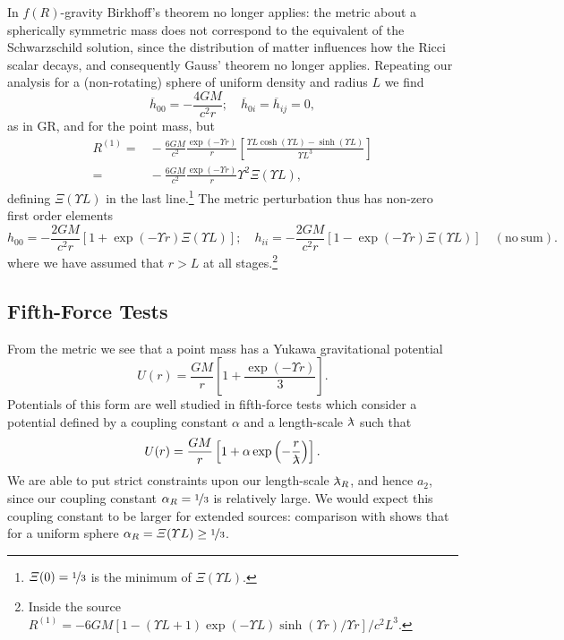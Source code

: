 In $f(R)$-gravity Birkhoff's theorem no longer applies: the metric about a spherically symmetric mass does not correspond to the equivalent of the Schwarzschild solution, since the distribution of matter influences how the Ricci scalar decays, and consequently Gauss' theorem no longer applies. Repeating our analysis for a (non-rotating) sphere of uniform density and radius $L$ we find
\begin{equation}
\overline{h}_{00} = -\frac{4GM}{c^2r}; \quad \overline{h}_{0i} = \overline{h}_{ij} = 0,
\end{equation}
as in GR, and for the point mass, but
\begin{align}
R^{(1)} = & {} -\frac{6 G M}{c^2}\frac{\exp(- \Upsilon r)}{r}\left[\frac{\Upsilon L\cosh(\Upsilon L) - \sinh(\Upsilon L)}{\Upsilon L^3}\right] \\
 = & {} -\frac{6 G M}{c^2}\frac{\exp(- \Upsilon r)}{r}\Upsilon^2\Xi(\Upsilon L),
\end{align}
defining $\Xi(\Upsilon L)$ in the last line.\footnote{$\Xi(0) = \nicefrac{1}{3}$ is the minimum of $\Xi(\Upsilon L)$.} The metric perturbation thus has non-zero first order elements\cite{Stelle1978, Capozziello2009b}
\begin{equation}
h_{00} = -\frac{2GM}{c^2r}\left[1 + \exp(- \Upsilon r)\Xi(\Upsilon L)\right]; \quad h_{ii} = -\frac{2GM}{c^2r}\left[1 - \exp(- \Upsilon r)\Xi(\Upsilon L)\right] \quad \mathrm{(no\: sum)}.
\label{eq:Uniform}
\end{equation}
where we have assumed that $r > L$ at all stages.\footnote{Inside the source $R^{(1)} = -{6 G M}\left[1 - (\Upsilon L + 1)\exp(-\Upsilon L)\sinh(\Upsilon r)/\Upsilon r\right]/{c^2L^3}$.}

\subsection{Fifth-Force Tests}\label{sec:Fifth}

From the metric  we see that a point mass has a Yukawa gravitational potential\cite{Stelle1978, Capozziello2009a}
\begin{equation}
U(r) = \frac{GM}{r}\left[1 + \frac{\exp(- \Upsilon r)}{3}\right].
\end{equation}
Potentials of this form are well studied in fifth-force tests\cite{Will2006, Adelberger2009, Adelberger2003} which consider a potential defined by a coupling constant $\alpha$ and a length-scale $\lambdabar$ such that
\begin{equation}
U(r) = \frac{GM}{r}\left[1 + \alpha\exp\left(-\frac{r}{\lambdabar}\right)\right].
\end{equation}
We are able to put strict constraints upon our length-scale $\lambdabar_R$, and hence $a_2$, since our coupling constant $\alpha_R = \nicefrac{1}{3}$ is relatively large. We would expect this coupling constant to be larger for extended sources: comparison with  shows that for a uniform sphere $\alpha_R = \Xi(\Upsilon L) \geq \nicefrac{1}{3}$.

